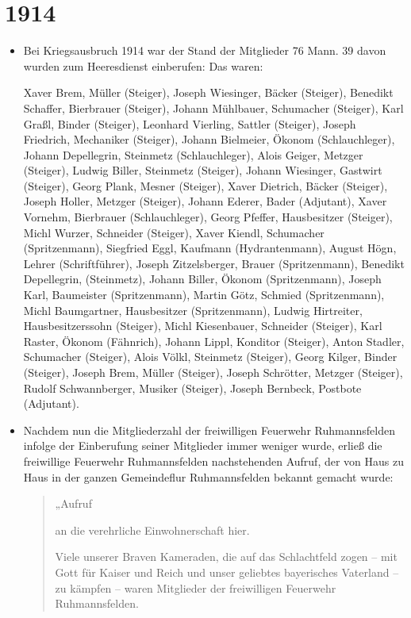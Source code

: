 \documentclass[12pt,a4paper]{book}
\begin{document}
\section*{1914}
\begin{itemize}

\item Bei Kriegsausbruch 1914 war der Stand der Mitglieder 76 Mann. 39 davon
wurden zum Heeresdienst einberufen: Das waren:

Xaver Brem, Müller (Steiger), Joseph Wiesinger, Bäcker (Steiger), Benedikt
Schaffer, Bierbrauer (Steiger), Johann Mühlbauer, Schumacher (Steiger), Karl
Graßl, Binder (Steiger), Leonhard Vierling, Sattler (Steiger), Joseph Friedrich,
Mechaniker (Steiger), Johann Bielmeier, Ökonom (Schlauchleger), Johann
Depellegrin, Steinmetz (Schlauchleger), Alois Geiger, Metzger (Steiger), Ludwig
Biller, Steinmetz (Steiger), Johann Wiesinger, Gastwirt (Steiger), Georg Plank,
Mesner (Steiger), Xaver Dietrich, Bäcker (Steiger), Joseph Holler, Metzger
(Steiger), Johann Ederer, Bader (Adjutant), Xaver Vornehm, Bierbrauer
(Schlauchleger), Georg Pfeffer, Hausbesitzer (Steiger), Michl Wurzer, Schneider
(Steiger), Xaver Kiendl, Schumacher (Spritzenmann), Siegfried Eggl, Kaufmann
(Hydrantenmann), August Högn, Lehrer (Schriftführer), Joseph Zitzelsberger,
Brauer (Spritzenmann), Benedikt Depellegrin, (Steinmetz), Johann Biller, Ökonom
(Spritzenmann), Joseph Karl, Baumeister (Spritzenmann), Martin Götz, Schmied
(Spritzenmann), Michl Baumgartner, Hausbesitzer (Spritzenmann), Ludwig
Hirtreiter, Hausbesitzerssohn (Steiger), Michl Kiesenbauer, Schneider (Steiger),
Karl Raster, Ökonom (Fähnrich), Johann Lippl, Konditor (Steiger), Anton Stadler,
Schumacher (Steiger), Alois Völkl, Steinmetz (Steiger), Georg Kilger, Binder
(Steiger), Joseph Brem, Müller (Steiger), Joseph Schrötter, Metzger (Steiger),
Rudolf Schwannberger, Musiker (Steiger), Joseph Bernbeck, Postbote (Adjutant).

\item Nachdem nun die Mitgliederzahl der freiwilligen Feuerwehr Ruhmannsfelden
infolge der Einberufung seiner Mitglieder immer weniger wurde, erließ die
freiwillige Feuerwehr Ruhmannsfelden nachstehenden Aufruf, der von Haus zu Haus
in der ganzen Gemeindeflur Ruhmannsfelden bekannt gemacht wurde:

\begin{quote}
„Aufruf

an die verehrliche Einwohnerschaft hier.

Viele unserer Braven Kameraden, die auf das Schlachtfeld zogen – mit Gott für
Kaiser und Reich und unser geliebtes bayerisches Vaterland – zu kämpfen – waren
Mitglieder der freiwilligen Feuerwehr Ruhmannsfelden.


\end{quote}
\end{itemize}
\end{document}

